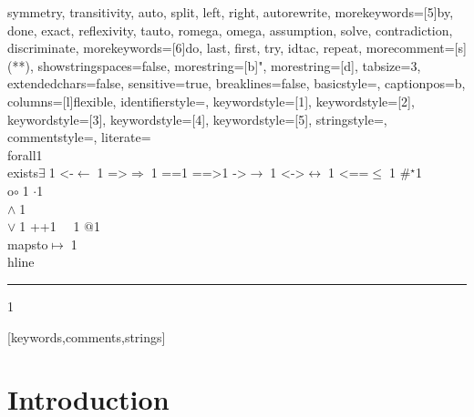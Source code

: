 {{        symmetry, transitivity, auto, split, left, right, autorewrite},
    morekeywords=[5]{by, done, exact, reflexivity, tauto, romega, omega,
        assumption, solve, contradiction, discriminate},
    morekeywords=[6]{do, last, first, try, idtac, repeat},
    morecomment=[s]{(*}{*)},
    showstringspaces=false,
    morestring=[b]",
    morestring=[d],
    tabsize=3,
    extendedchars=false,
    sensitive=true,
    breaklines=false,
    basicstyle=\linespread{0.5}\ttfamily\footnotesize,
    captionpos=b,
    columns=[l]flexible,
    identifierstyle={\ttfamily\color{black}},
    keywordstyle=[1]{\ttfamily\color{dkviolet}},
    keywordstyle=[2]{\ttfamily\color{dkgreen}},
    keywordstyle=[3]{\ttfamily\color{ltblue}},
    keywordstyle=[4]{\ttfamily\color{dkblue}},
    keywordstyle=[5]{\ttfamily\color{dkred}},
    stringstyle=\ttfamily,
    commentstyle={\ttfamily\color{dkgreen}},
    literate=
    {\\forall}{{\color{dkgreen}{$\forall\;$}}}1
    {\\exists}{{$\exists\;$}}1
    {<-}{{$\leftarrow\;$}}1
    {=>}{{$\Rightarrow\;$}}1
    {==}{{\code{==}\;}}1
    {==>}{{\code{==>}\;}}1
    {->}{{$\rightarrow\;$}}1
    {<->}{{$\leftrightarrow\;$}}1
    {<==}{{$\leq\;$}}1
    {\#}{{$^\star$}}1 
    {\\o}{{$\circ\;$}}1 
    {\@}{{$\cdot$}}1 
    {\/\\}{{$\wedge\;$}}1
    {\\\/}{{$\vee\;$}}1
    {++}{{\code{++}}}1
    {~}{{\ }}1
    {\@\@}{{$@$}}1
    {\\mapsto}{{$\mapsto\;$}}1
    {\\hline}{{\rule{\linewidth}{0.5pt}}}1
}[keywords,comments,strings]

\section{Introduction}
\label{sec:intro}



